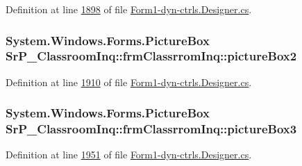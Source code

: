 \-Definition at line \hyperlink{_form1-dyn-ctrls_8_designer_8cs_source_l01898}{1898} of file \hyperlink{_form1-dyn-ctrls_8_designer_8cs_source}{\-Form1-\/dyn-\/ctrls.\-Designer.\-cs}.

\hypertarget{class_sr_p___classroom_inq_1_1frm_classrrom_inq_aeb268a5866f810521414bd3fd047ca72}{
\subsubsection[{picture\-Box2}]{\setlength{\rightskip}{0pt plus 5cm}\-System.\-Windows.\-Forms.\-Picture\-Box {\bf \-Sr\-P\-\_\-\-Classroom\-Inq\-::frm\-Classrrom\-Inq\-::picture\-Box2}}}
\label{class_sr_p___classroom_inq_1_1frm_classrrom_inq_aeb268a5866f810521414bd3fd047ca72}


\-Definition at line \hyperlink{_form1-dyn-ctrls_8_designer_8cs_source_l01910}{1910} of file \hyperlink{_form1-dyn-ctrls_8_designer_8cs_source}{\-Form1-\/dyn-\/ctrls.\-Designer.\-cs}.

\hypertarget{class_sr_p___classroom_inq_1_1frm_classrrom_inq_a1320c0263001c5045f415d68935ae50e}{
\subsubsection[{picture\-Box3}]{\setlength{\rightskip}{0pt plus 5cm}\-System.\-Windows.\-Forms.\-Picture\-Box {\bf \-Sr\-P\-\_\-\-Classroom\-Inq\-::frm\-Classrrom\-Inq\-::picture\-Box3}}}
\label{class_sr_p___classroom_inq_1_1frm_classrrom_inq_a1320c0263001c5045f415d68935ae50e}


\-Definition at line \hyperlink{_form1-dyn-ctrls_8_designer_8cs_source_l01951}{1951} of file \hyperlink{_form1-dyn-ctrls_8_designer_8cs_source}{\-Form1-\/dyn-\/ctrls.\-Designer.\-cs}.

